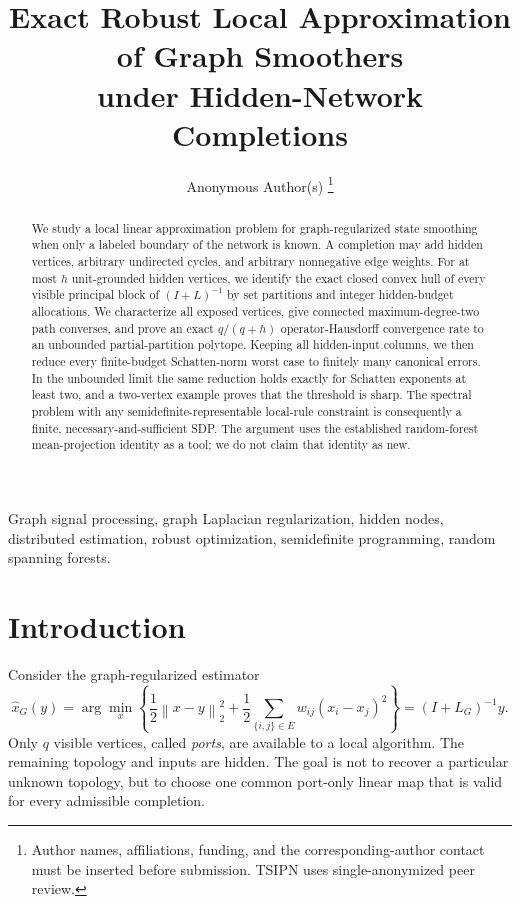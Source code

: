 \documentclass[journal,10pt]{IEEEtran}
\title{Exact Robust Local Approximation of Graph Smoothers\\
under Hidden-Network Completions}
\author{Anonymous Author(s)%
\thanks{Author names, affiliations, funding, and the corresponding-author
contact must be inserted before submission. TSIPN uses single-anonymized
peer review.}}
\theoremstyle{definition}
\theoremstyle{remark}
\newcommand{\norm}[1]{\left\lVert #1\right\rVert}
\begin{document}
\maketitle

\begin{abstract}
We study a local linear approximation problem for graph-regularized state
smoothing when only a labeled boundary of the network is known.  A completion
may add hidden vertices, arbitrary undirected cycles, and arbitrary
nonnegative edge weights.  For at most $h$ unit-grounded hidden vertices, we
identify the exact closed convex hull of every visible principal block of
$(I+L)^{-1}$ by set partitions and integer hidden-budget allocations.  We
characterize all exposed vertices, give connected maximum-degree-two path
converses, and prove an exact $q/(q+h)$ operator-Hausdorff convergence rate to
an unbounded partial-partition polytope.  Keeping all hidden-input columns, we
then reduce every finite-budget Schatten-norm worst case to finitely many
canonical errors.  In the unbounded limit the same reduction holds exactly
for Schatten exponents at least two, and a two-vertex example proves that the
threshold is sharp.  The spectral problem with any semidefinite-representable
local-rule constraint is consequently a finite, necessary-and-sufficient SDP.
The argument uses the established random-forest mean-projection identity as a
tool; we do not claim that identity as new.
\end{abstract}

\begin{IEEEkeywords}
Graph signal processing, graph Laplacian regularization, hidden nodes,
distributed estimation, robust optimization, semidefinite programming,
random spanning forests.
\end{IEEEkeywords}

\section{Introduction}

Consider the graph-regularized estimator
\begin{equation}
  \widehat x_G(y)
  =\arg\min_x\left\{
       \frac12\norm{x-y}_2^2
       +\frac12\sum_{\{i,j\}\in E}w_{ij}(x_i-x_j)^2
    \right\}
  =(I+L_G)^{-1}y .
  \label{eq:smoother}
\end{equation}
Only $q$ visible vertices, called \emph{ports}, are available to a local
algorithm.  The remaining topology and inputs are hidden.  The goal is not to
recover a particular unknown topology, but to choose one common port-only
linear map that is valid for every admissible completion.
\end{document}
